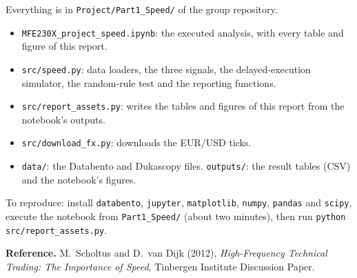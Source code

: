 \documentclass[11pt]{article}
\begin{document}
Everything is in \texttt{Project/Part1\_Speed/} of the group repository.

\begin{itemize}
  \item \texttt{MFE230X\_project\_speed.ipynb}: the executed analysis, with every
        table and figure of this report.
  \item \texttt{src/speed.py}: data loaders, the three signals, the
        delayed-execution simulator, the random-rule test and the reporting
        functions.
  \item \texttt{src/report\_assets.py}: writes the tables and figures of this
        report from the notebook's outputs.
  \item \texttt{src/download\_fx.py}: downloads the EUR/USD ticks.
  \item \texttt{data/}: the Databento and Dukascopy files. \texttt{outputs/}: the
        result tables (CSV) and the notebook's figures.
\end{itemize}

To reproduce: install \texttt{databento}, \texttt{jupyter}, \texttt{matplotlib},
\texttt{numpy}, \texttt{pandas} and \texttt{scipy}, execute the notebook from
\texttt{Part1\_Speed/} (about two minutes), then run
\texttt{python src/report\_assets.py}.

\textbf{Reference.} M.~Scholtus and D.~van Dijk (2012), \emph{High-Frequency
Technical Trading: The Importance of Speed}, Tinbergen Institute Discussion Paper.
\end{document}
